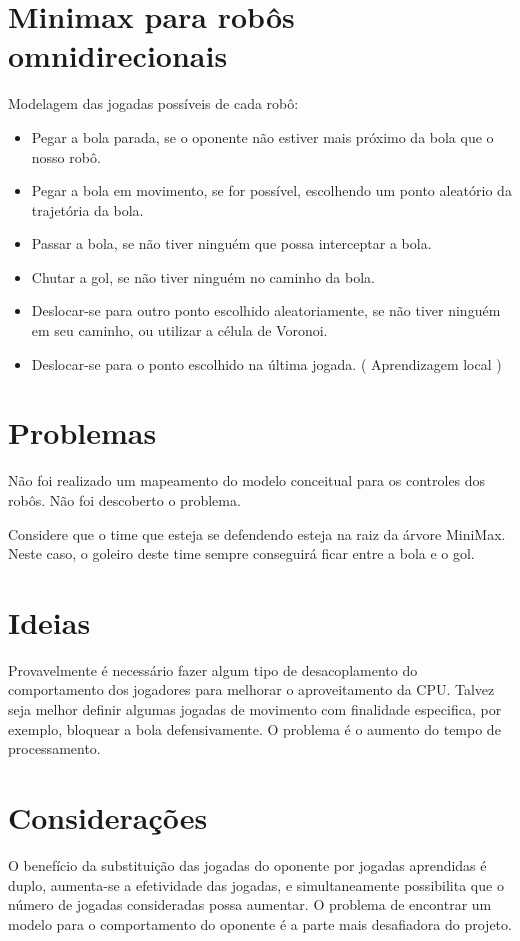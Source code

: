 \section{Minimax para robôs omnidirecionais}
Modelagem das jogadas possíveis de cada robô:
\begin{itemize}
 \item Pegar a bola parada, se o oponente não estiver mais próximo da bola que o
 nosso robô.
 \item Pegar a bola em movimento, se for possível, escolhendo um ponto aleatório
 da trajetória da bola.
 \item Passar a bola, se não tiver ninguém que possa interceptar a bola.
 \item Chutar a gol, se não tiver ninguém no caminho da bola.
 \item Deslocar-se para outro ponto escolhido aleatoriamente, se não tiver ninguém
 em seu caminho, ou utilizar a célula de Voronoi.
 \item Deslocar-se para o ponto escolhido na última jogada. ( Aprendizagem local )
\end{itemize}

\section{Problemas}
Não foi realizado um mapeamento do modelo conceitual para os
controles dos robôs. Não foi descoberto o problema.

Considere que o time que esteja se defendendo esteja na raiz da árvore MiniMax.
Neste caso, o goleiro deste time sempre conseguirá ficar entre a bola e o gol.

\section{Ideias}
Provavelmente é necessário fazer algum tipo de desacoplamento do comportamento dos
jogadores para melhorar o aproveitamento da CPU\@.
Talvez seja melhor definir algumas jogadas de movimento com finalidade especifica,
por exemplo, bloquear a bola defensivamente. O problema é o aumento do tempo de
processamento.

\section{Considerações}
O benefício da substituição das jogadas do oponente por jogadas aprendidas é duplo,
aumenta-se a efetividade das jogadas, e simultaneamente possibilita que o
número de jogadas consideradas possa aumentar. O problema de encontrar um
modelo para o comportamento do oponente é a parte mais desafiadora do projeto.

